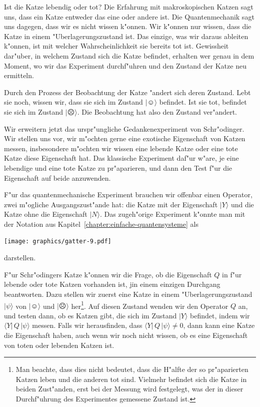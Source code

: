 Ist die Katze lebendig oder tot? Die Erfahrung mit makroskopischen
Katzen sagt uns, dass ein Katze entweder das eine oder andere ist.
Die Quantenmechanik sagt uns dagegen, dass wir es nicht wissen k"onnen.
Wir k"onnen nur wissen, dass die Katze in einem "Uberlagerungszustand
ist.
Das einzige, was wir daraus ableiten k"onnen, ist mit welcher
Wahrscheinlichkeit sie bereits tot ist.
Gewissheit dar"uber, in welchem Zustand sich die Katze befindet,
erhalten wer genau in dem Moment, wo wir das Experiment durchf"uhren
und den Zustand der Katze neu ermitteln.

Durch den Prozess der Beobachtung der Katze "andert sich deren Zustand.
Lebt sie noch, wissen wir, dass sie sich im Zustand $|\smiley\rangle$ befindet.
Ist sie tot, befindet sie sich im Zustand $|\frownie\rangle$.
Die Beobachtung hat also den Zustand ver"andert.

Wir erweitern jetzt das urspr"ungliche Gedankenexperiment von Schr"odinger.
Wir stellen uns vor, wir m"ochten gerne eine exotische Eigenschaft von
Katzen messen, insbesondere m"ochten wir wissen eine lebende Katze oder
eine tote Katze diese Eigenschaft hat. Das klassische Experiment
daf"ur w"are, je eine lebendige und eine tote Katze zu pr"aparieren,
und dann den Test f"ur die Eigenschaft auf beide anzuwenden.

F"ur das quantenmechanische Experiment brauchen wir offenbar einen
Operator, zwei m"ogliche Ausgangszust"ande hat: die Katze mit der
Eigenschaft $|Y\rangle$ und die Katze ohne die Eigenschaft $|N\rangle$.
Das zugeh"orige Experiment k"onnte man mit der Notation aus
Kapitel~\ref{chapter:einfache-quantensysteme} als
\begin{center}
\texttt{[image: graphics/gatter-9.pdf]}
\end{center}
darstellen. 

F"ur Schr"odingers Katze k"onnen wir die Frage, ob die Eigenschaft $Q$
in f"ur lebende oder tote Katzen vorhanden ist, jin einem einzigen
Durchgang beantworten.
Dazu stellen wir zuerst eine Katze in einem "Uberlagerungszustand
$|\psi\rangle$ von $|\smiley\rangle$ und $|\frownie\rangle$ her\footnote{
Man beachte, dass dies nicht bedeutet, dass die H"alfte der so pr"aparierten
Katzen leben und die anderen tot sind.
Vielmehr befindet sich die Katze in beiden Zust"anden, erst bei der
Messung wird festgelegt, was der in dieser Durchf"uhrung des Experimentes
gemessene Zustand ist.
}.
Auf diesen Zustand wenden wir den Operator $Q$ an, und testen dann,
ob es Katzen gibt, die sich im Zustand $|Y\rangle$ befindet, indem
wir $\langle Y|\,Q\,|\psi\rangle$ messen.
Falls wir herausfinden, dass $\langle Y|\,Q\,|\psi\rangle\ne 0$,
dann kann eine Katze die Eigenschaft haben, auch wenn wir noch nicht
wissen, ob es eine Eigenschaft von toten oder lebenden Katzen ist.

